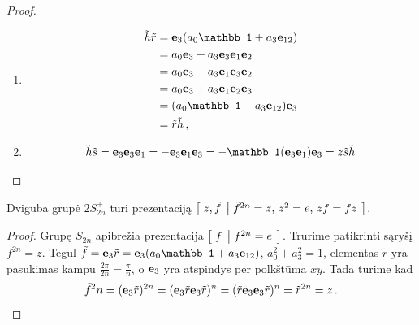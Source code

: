 \begin{proof}
\begin{enumerate}
\begin{equation}
\begin{aligned}
					\\&=a_0 \mathbb1 + a_3 \vb e_2 \vb e_3 \vb e_3 \vb e_1
					\\&=a_0 \mathbb1 + a_3 \vb e_2 \vb e_1
					\\&=a_0 \mathbb1 - a_3 \vb e_1 \vb e_2 
					\\&=\tilde r^{-1}
					\,,
				\end{aligned}
			\end{equation} 
		\item
			\begin{equation}
				\begin{aligned}
					\tilde h\tilde r 
					&= \vb e_3(a_0 \mathbb1 + a_3 \vb e_{12})
					\\&= a_0 \vb e_3 + a_3 \vb e_3 \vb e_1 \vb e_2
					\\&= a_0 \vb e_3 - a_3 \vb e_1 \vb e_3 \vb e_2
					\\&= a_0 \vb e_3 + a_3 \vb e_1 \vb e_2 \vb e_3
					\\&= (a_0 \mathbb1 + a_3 \vb e_{12})\vb e_3 
					\\&=\tilde r\tilde h 
					\,,
				\end{aligned}
			\end{equation}
		\item
			\begin{equation}
				\tilde h\tilde s
				= \vb e_3 \vb e_3 \vb e_1
				= - \vb e_3 \vb e_1 \vb e_3 
				= -\mathbb1 (\vb e_3 \vb e_1) \vb e_3 
				=z\tilde s\tilde h
			\end{equation}
	\end{enumerate}
\end{proof}


\begin{proposition}
	Dviguba grupė $2S_{2n}^+$ turi prezentaciją
	$\left[\; z,\tilde f \;\left|\; \tilde f^{2n}=z,\, z^2=e,\, zf=fz \;\right.\right]$.
\end{proposition}
\begin{proof}
	Grupę $S_{2n}$ apibrežia prezentacija $\left[\; f \;\left|\; f^{2n}=e \;\right.\right]$.
	Trurime patikrinti sąryšį $f^{2n}=z$.
	Tegul $\tilde f = \vb e_3 \tilde r = \vb e_3 (a_0\mathbb1 + a_3 \vb e_{12})$, $a_0^2 + a_3^2 = 1$,
	elementas $\tilde r$ yra pasukimas kampu $\frac{2\pi}{2n}=\frac{\pi}{n}$,
	o $\vb e_3$ yra atspindys per polkštūma $xy$.
	Tada turime kad
	\begin{equation}
		\tilde f^2n = (\vb e_3 \tilde r)^{2n} 
		= (\vb e_3 \tilde r \vb e_3 \tilde r)^n 
		= (\tilde r \vb e_3 \vb e_3 \tilde r)^n 
		= \tilde r^{2n} = z
		\,.
	\end{equation}
\end{proof}


